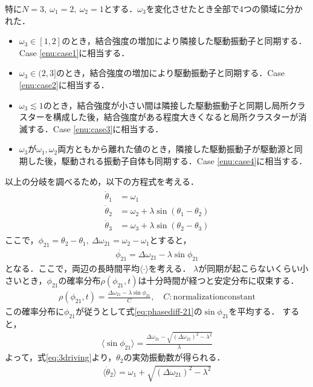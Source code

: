 \documentclass[../main]{subfiles}
\begin{document}
特に$N=3,\ \omega_1=2,\ \omega_2=1$とする．$\omega_3$を変化させたとき全部で4つの領域に分かれた．
\begin{itemize}
    \item $\omega_3\in[1,2]$のとき，結合強度の増加により隣接した駆動振動子と同期する．Case \ref{enu:case1}に相当する．
    \item $\omega_3\in(2,3]$のとき，結合強度の増加により駆動振動子と同期する．Case \ref{enu:case2}に相当する．
    \item $\omega_3\lesssim 1$のとき，結合強度が小さい間は隣接した駆動振動子と同期し局所クラスターを構成した後，結合強度がある程度大きくなると局所クラスターが消滅する．Case \ref{enu:case3}に相当する．
    \item $\omega_3$が$\omega_1,\omega_2$両方ともから離れた値のとき，隣接した駆動振動子が駆動源と同期した後，駆動される振動子自体も同期する．Case \ref{enu:case4}に相当する．
\end{itemize}
以上の分岐を調べるため，以下の方程式を考える．
\begin{align}
    \label{eq:3driving}
    \begin{split}
        \dot{\theta}_1&=\omega_1\\
        \dot{\theta}_2&=\omega_2+\lambda\sin(\theta_1-\theta_2)\\
        \dot{\theta}_3&=\omega_3+\lambda\sin(\theta_2-\theta_3)
    \end{split}
\end{align}
ここで，$\phi_{21}=\theta_2-\theta_1,\ \Delta\omega_{21}=\omega_2-\omega_1$とすると，
\begin{align}
    \label{eq:phasediff-21}
    \dot{\phi_{21}}=\Delta\omega_{21}-\lambda\sin\phi_{21}
\end{align}
となる．ここで，両辺の長時間平均$\langle\cdot\rangle$を考える．
$\lambda$が同期が起こらないくらい小さいとき，$\phi_{21}$の確率分布$\rho(\phi_{21},t)$は十分時間が経つと安定分布に収束する．
\begin{align*}
    \rho(\phi_{21},t)=\frac{\Delta\omega_{21}-\lambda\sin\phi_{21}}{C},\quad C:\mathrm{normalization constant}
\end{align*}
この確率分布に$\phi_{21}$が従うとして式\eqref{eq:phasediff-21}の$\sin\phi_{21}$を平均する．
すると，
\begin{align*}
    \langle\sin\phi_{21}\rangle=\frac{\Delta\omega_{21}-\sqrt{(\Delta\omega_{21})^2-\lambda^2}}{\lambda}
\end{align*}
よって，式\eqref{eq:3driving}より，$\theta_2$の実効振動数が得られる．
\begin{align*}
    \langle\dot{\theta}_2\rangle=\omega_1+\sqrt{(\Delta\omega_{21})^2-\lambda^2}
\end{align*}
\end{document}
